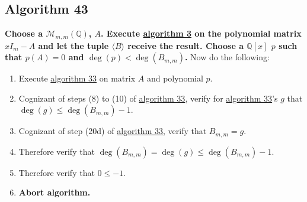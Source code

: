 \documentclass[twocolumn]{article}
\begin{document}
		\subsection{Algorithm 43}\label{sec:algorithm 43}
			\textbf{Choose a $\mathcal{M}_{m,m}(\mathbb{Q})$, $A$. Execute \hyperref[sec:algorithm 3]{algorithm 3} on the polynomial matrix $xI_m-A$ and let the tuple $\langle B\rangle$ receive the result. Choose a $\mathbb{Q}[x]$ $p$ such that $p(A)=0$ and $\deg(p)<\deg(B_{m,m})$.} Now do the following:
			\begin{enumerate}
				\item Execute \hyperref[sec:algorithm 33]{algorithm 33} on matrix $A$ and polynomial $p$.
				\item Cognizant of steps (8) to (10) of \hyperref[sec:algorithm 33]{algorithm 33}, verify for \hyperref[sec:algorithm 33]{algorithm 33}'s $g$ that $\deg(g)\le\deg(B_{m,m})-1$.
				\item Cognizant of step (20d) of \hyperref[sec:algorithm 33]{algorithm 33}, verify that $B_{m,m}=g$.
				\item Therefore verify that $\deg(B_{m,m})=\deg(g)\le\deg(B_{m,m})-1$.
				\item Therefore verify that $0\le -1$.
				\item \textbf{Abort algorithm.}
			\end{enumerate}
\end{document}
